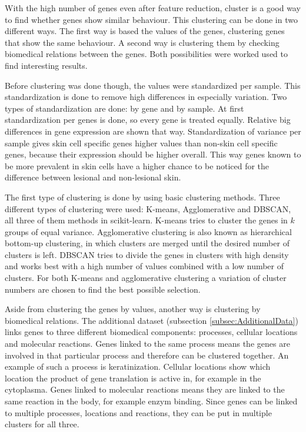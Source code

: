 \documentclass[10pt,a4paper]{article}
\begin{document}
	With the high number of genes even after feature reduction, cluster is a good way to find whether genes show similar behaviour. This clustering can be done in two different ways. The first way is based the values of the genes, clustering genes that show the same behaviour. A second way is clustering them by checking biomedical relations between the genes. Both possibilities were worked used to find interesting results.
	
	Before clustering was done though, the values were standardized per sample. This standardization is done to remove high differences in especially variation. Two types of standardization are done: by gene and by sample. At first standardization per genes is done, so every gene is treated equally. Relative big differences in gene expression are shown that way. Standardization of variance per sample gives skin cell specific genes higher values than non-skin cell specific genes, because their expression should be higher overall. This way genes known to be more prevalent in skin cells have a higher chance to be noticed for the difference between lesional and non-lesional skin.
	
	The first type of clustering is done by using basic clustering methods. Three different types of clustering were used: K-means, Agglomerative and DBSCAN, all three of them methods in scikit-learn. K-means tries to cluster the genes in $k$ groups of equal variance. Agglomerative clustering is also known as hierarchical bottom-up clustering, in which clusters are merged until the desired number of clusters is left. DBSCAN tries to divide the genes in clusters with high density and works best with a high number of values combined with a low number of clusters. For both K-means and agglomerative clustering a variation of cluster numbers are chosen to find the best possible selection. 
	
	Aside from clustering the genes by values, another way is clustering by biomedical relations. The additional dataset (subsection \ref{subsec:AdditionalData}) links genes to three different biomedical components: processes, cellular locations and molecular reactions. Genes linked to the same process means the genes are involved in that particular process and therefore can be clustered together. An example of such a process is keratinization. Cellular locations show which location the product of gene translation is active in, for example in the cytoplasma. Genes linked to molecular reactions means they are linked to the same reaction in the body, for example enzym binding. Since genes can be linked to multiple processes, locations and reactions, they can be put in multiple clusters for all three.
	
\end{document}
